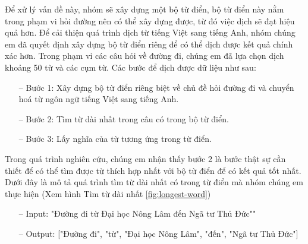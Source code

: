 Để xử lý vấn đề này, nhóm sẽ xây dựng một bộ từ điển, bộ từ điển này nằm trong phạm vi hỏi đường nên có thể xây dựng được, từ đó việc dịch sẽ đạt hiệu quả hơn.
Để cải thiện quá trình dịch từ tiếng Việt sang tiếng Anh, nhóm chúng em đã quyết định xây dựng bộ từ điển riêng để có thể dịch được kết quả chính xác hơn.
Trong phạm vi các câu hỏi về đường đi, chúng em đã lựa chọn dịch khoảng 50 từ và các cụm từ. Các bước để dịch được dữ liệu như sau:
\begin{itemize}
    \item[--] Bước 1: Xây dựng bộ từ điển riêng biệt về chủ đề hỏi đường đi và chuyển hoá từ ngôn ngữ tiếng Việt sang tiếng Anh.
    \item[--] Bước 2: Tìm từ dài nhất trong câu có trong bộ từ điển.
    \item[--] Bước 3: Lấy nghĩa của từ tương ứng trong từ điển.
\end{itemize}
Trong quá trình nghiên cứu, chúng em nhận thấy bước 2 là bước thật sự cần thiết để có thể tìm được từ thích hợp nhất với bộ từ điển để có kết quả tốt nhất. Dưới đây là mô tả quá trình tìm từ dài nhất có trong từ điển mà nhóm chúng em thực hiện (Xem hình Tìm từ dài nhất \ref{fig:longest-word})
\begin{itemize}
    \item[--] Input: "Đường đi từ Đại học Nông Lâm đến Ngã tư Thủ Đức""
    \item[--] Output: ["Đường đi", "từ", "Đại học Nông Lâm", "đến", "Ngã tư Thủ Đức"]
\end{itemize}
